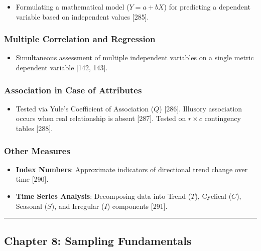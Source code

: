 \documentclass[
]{article}
\providecommand{\tightlist}{%
  \setlength{\itemsep}{0pt}\setlength{\parskip}{0pt}}
\begin{document}
\begin{itemize}
\tightlist
\item
  Formulating a mathematical model (\(Y = a + bX\)) for predicting a
  dependent variable based on independent values {[}285{]}.
\end{itemize}

\subsubsection{Multiple Correlation and
Regression}\label{multiple-correlation-and-regression}

\begin{itemize}
\tightlist
\item
  Simultaneous assessment of multiple independent variables on a single
  metric dependent variable {[}142, 143{]}.
\end{itemize}

\subsubsection{Association in Case of
Attributes}\label{association-in-case-of-attributes}

\begin{itemize}
\tightlist
\item
  Tested via Yule's Coefficient of Association (\(Q\)) {[}286{]}.
  Illusory association occurs when real relationship is absent
  {[}287{]}. Tested on \(r \times c\) contingency tables {[}288{]}.
\end{itemize}

\subsubsection{Other Measures}\label{other-measures}

\begin{itemize}
\tightlist
\item
  \textbf{Index Numbers}: Approximate indicators of directional trend
  change over time {[}290{]}.
\item
  \textbf{Time Series Analysis}: Decomposing data into Trend (\(T\)),
  Cyclical (\(C\)), Seasonal (\(S\)), and Irregular (\(I\)) components
  {[}291{]}.
\end{itemize}

\begin{center}\rule{0.5\linewidth}{0.5pt}\end{center}

\subsection{Chapter 8: Sampling
Fundamentals}\label{chapter-8-sampling-fundamentals}
\end{document}
